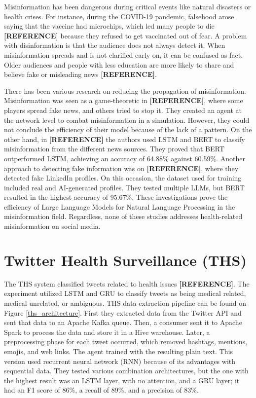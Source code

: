 Misinformation has been dangerous during critical events like natural disasters or health crises. For instance, during the COVID-19 pandemic, falsehood arose saying that the vaccine had
microchips, which led many people to die \textbf{[REFERENCE]} because they refused to get vaccinated out of fear. A problem with disinformation is that the audience does not always detect it. When misinformation
spreads and is not clarified early on, it can be confused as fact. Older audiences and people with less education are more likely to share and believe fake or misleading news \textbf{[REFERENCE]}. 

There has been various research on reducing the propagation of misinformation. Misinformation was seen as a game-theoretic in \textbf{[REFERENCE]}, where some players spread fake news, and others tried
to stop it. They created an agent at the network level to combat misinformation in a simulation. However, they could not conclude the efficiency of their model because of the lack of a pattern. On
the other hand, in \textbf{[REFERENCE]} the authors used LSTM and BERT to classify misinformation from the different news sources. They proved that BERT outperformed LSTM, achieving an accuracy of 64.88\% against 60.59\%. 
Another approach to detecting fake information was on \textbf{[REFERENCE]}, where they detected fake LinkedIn profiles. On this occasion, the dataset used for training included real and AI-generated profiles. They tested multiple
LLMs, but BERT resulted in the highest accuracy of 95.67\%. These investigations prove the efficiency of Large Language Models for Natural Language Processing in the misinformation field. Regardless,
none of these studies addresses health-related misinformation on social media.




\section{Twitter Health Surveillance (THS)}
The THS system classified tweets related to health issues \textbf{[REFERENCE]}. The experiment utilized LSTM and GRU to classify tweets as being medical related, medical unrelated, or ambiguous. THS
data extraction pipeline can be found on Figure \ref{ths_architecture}. First they extracted data from the Twitter API and sent that data to an Apache Kafka queue. Then, a consumer sent it to Apache Spark
to process the data and store it in a Hive warehouse. Later, a preprocessing phase for each tweet occurred, which removed hashtags, mentions, emojis, and web links. The agent trained with the resulting
plain text. This version used recurrent neural network (RNN) because of its advantages with sequential data. They tested various combination architectures, but the one with the highest result was an
LSTM layer, with no attention, and a GRU layer; it had an F1 score of 86\%, a recall of 89\%, and a precision of 83\%.  
 
